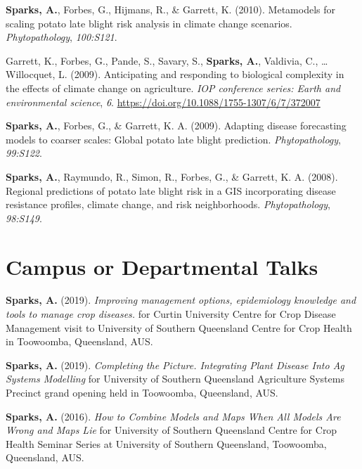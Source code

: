 \documentclass[11pt, a4paper]{awesome-cv}
\begin{document}
\leavevmode\hypertarget{ref-Sparks2010}{}%
\textbf{Sparks, A.}, Forbes, G., Hijmans, R., \& Garrett, K. (2010).
Metamodels for scaling potato late blight risk analysis in climate
change scenarios. \emph{Phytopathology}, \emph{100:S121}.

\leavevmode\hypertarget{ref-Garrett2009}{}%
Garrett, K., Forbes, G., Pande, S., Savary, S., \textbf{Sparks, A.},
Valdivia, C., \ldots{} Willocquet, L. (2009). Anticipating and
responding to biological complexity in the effects of climate change on
agriculture. \emph{IOP conference series: Earth and environmental
science}, \emph{6}. \url{https://doi.org/10.1088/1755-1307/6/7/372007}

\leavevmode\hypertarget{ref-Sparks2009}{}%
\textbf{Sparks, A.}, Forbes, G., \& Garrett, K. A. (2009). Adapting
disease forecasting models to coarser scales: {Global} potato late
blight prediction. \emph{Phytopathology}, \emph{99:S122}.

\leavevmode\hypertarget{ref-Sparks2008b}{}%
\textbf{Sparks, A.}, Raymundo, R., Simon, R., Forbes, G., \& Garrett, K.
A. (2008). Regional predictions of potato late blight risk in a {GIS}
incorporating disease resistance profiles, climate change, and risk
neighborhoods. \emph{Phytopathology}, \emph{98:S149}.

\endgroup

\hypertarget{campus-or-departmental-talks}{%
\section{Campus or Departmental
Talks}\label{campus-or-departmental-talks}}

\begingroup
\setlength{\parindent}{-0.5in}
\setlength{\leftskip}{0.5in}

\textbf{Sparks, A.} (2019). \emph{Improving management options,
epidemiology knowledge and tools to manage crop diseases.} for Curtin
University Centre for Crop Disease Management visit to University of
Southern Queensland Centre for Crop Health in Toowoomba, Queensland,
AUS.

\textbf{Sparks, A.} (2019). \emph{Completing the Picture. Integrating
Plant Disease Into Ag Systems Modelling} for University of Southern
Queensland Agriculture Systems Precinct grand opening held in Toowoomba,
Queensland, AUS.

\textbf{Sparks, A.} (2016). \emph{How to Combine Models and Maps When
All Models Are Wrong and Maps Lie} for University of Southern Queensland
Centre for Crop Health Seminar Series at University of Southern
Queensland, Toowoomba, Queensland, AUS.
\end{document}
